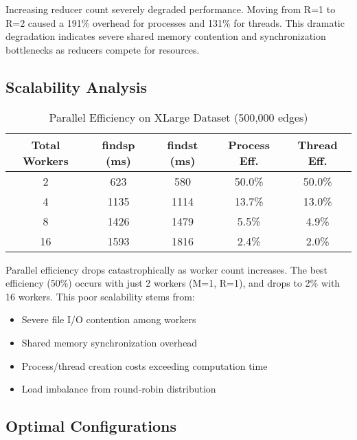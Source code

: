\documentclass[11pt]{article}
\begin{document}
Increasing reducer count severely degraded performance. Moving from R=1 to R=2 caused a 191\% overhead for processes and 131\% for threads. This dramatic degradation indicates severe shared memory contention and synchronization bottlenecks as reducers compete for resources.

\subsection{Scalability Analysis}

\begin{table}[H]
\centering
\caption{Parallel Efficiency on XLarge Dataset (500,000 edges)}
\begin{tabular}{ccccc}
\toprule
Total Workers & findsp (ms) & findst (ms) & Process Eff. & Thread Eff. \\
\midrule
2 & 623 & 580 & 50.0\% & 50.0\% \\
4 & 1135 & 1114 & 13.7\% & 13.0\% \\
8 & 1426 & 1479 & 5.5\% & 4.9\% \\
16 & 1593 & 1816 & 2.4\% & 2.0\% \\
\bottomrule
\end{tabular}
\end{table}

Parallel efficiency drops catastrophically as worker count increases. The best efficiency (50\%) occurs with just 2 workers (M=1, R=1), and drops to 2\% with 16 workers. This poor scalability stems from:
\begin{itemize}
    \item Severe file I/O contention among workers
    \item Shared memory synchronization overhead
    \item Process/thread creation costs exceeding computation time
    \item Load imbalance from round-robin distribution
\end{itemize}

\subsection{Optimal Configurations}
\end{document}
